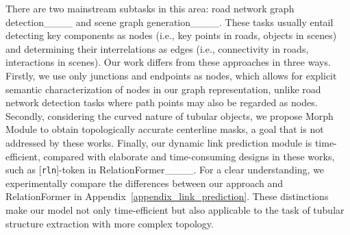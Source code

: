  There are two mainstream subtasks in this area: road network graph detection____ and scene graph generation____. These tasks usually entail detecting key components as nodes (i.e., key points in roads, objects in scenes) and determining their interrelations as edges (i.e., connectivity in roads, interactions in scenes).
Our work differs from these approaches in three ways. 
Firstly, we use only junctions and endpoints as nodes, which allows for explicit semantic characterization of nodes in our graph representation, unlike road network detection tasks where path points may also be regarded as nodes. Secondly, considering the curved nature of tubular objects, we propose Morph Module to obtain topologically accurate centerline masks, a goal that is not addressed by these works. Finally, our dynamic link prediction module is time-efficient, compared with elaborate and time-consuming designs in these works, such as [\texttt{rln}]-token in RelationFormer____. For a clear understanding, we experimentally compare the differences between our approach and RelationFormer in Appendix~\ref{appendix_link_prediction}. These distinctions make our model not only time-efficient but also applicable to the task of tubular structure extraction with more complex topology.